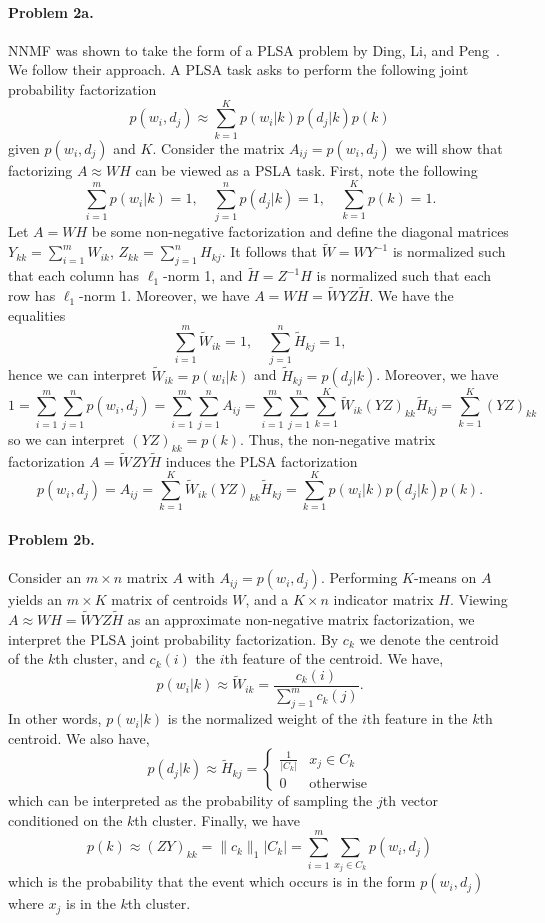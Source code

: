 \documentclass[12pt]{article}
\begin{document}
\paragraph{Problem 2a.}
NNMF was shown to take the form of a PLSA problem by Ding, Li, and Peng~\cite{Ding2008}. We follow their approach.
A PLSA task asks to perform the following joint probability factorization \[p(w_i, d_j) \approx \sum_{k=1}^K p(w_i | k) p(d_j | k) p(k) \] given $p(w_i, d_j)$ and $K$. Consider the matrix $A_{ij} = p(w_i, d_j)$ we will show that factorizing $A \approx WH$ can be viewed as a PSLA task.
First, note the following \[ \sum_{i=1}^m p(w_i|k) = 1, \quad  \sum_{j=1}^n p(d_j|k) = 1, \quad \sum_{k=1}^K p(k) = 1.\]
Let $A=WH$ be some non-negative factorization and define the diagonal matrices $Y_{kk} = \sum_{i=1}^m W_{ik}$, $Z_{kk} = \sum_{j=1}^n H_{kj}$.
It follows that $\tilde{W} = WY^{-1}$ is normalized such that each column has $\ell_1$-norm 1, and $\tilde{H} = Z^{-1}H$ is normalized such that each row has $\ell_1$-norm 1. Moreover, we have $A = WH = \tilde{W} Y Z \tilde{H}$.
We have the equalities \[\sum_{i=1}^m \tilde{W}_{ik} = 1, \quad \sum_{j=1}^n \tilde{H}_{kj} = 1,\] hence we can interpret $\tilde{W}_{ik} = p(w_i|k)$ and $\tilde{H}_{kj} = p(d_j|k)$.
Moreover, we have \[1 = \sum_{i=1}^m \sum_{j=1}^n p(w_i, d_j) = \sum_{i=1}^m \sum_{j=1}^n A_{ij} = \sum_{i=1}^m \sum_{j=1}^n \sum_{k=1}^K \tilde{W}_{ik} \left( YZ \right)_{kk} \tilde{H}_{kj} = \sum_{k=1}^K \left(Y Z \right)_{kk}\] so we can interpret $(YZ)_{kk} = p(k)$.
Thus, the non-negative matrix factorization $A = \tilde{W} ZY \tilde{H}$ induces the PLSA factorization \[p(w_i, d_j) = A_{ij} = \sum_{k=1}^K \tilde{W}_{ik} \left(YZ \right)_{kk} \tilde{H}_{kj} = \sum_{k=1}^K p(w_i|k)p(d_j|k)p(k). \]

\paragraph{Problem 2b.}
Consider an $m \times n$ matrix $A$ with $A_{ij} = p(w_i, d_j)$. Performing $K$-means on $A$ yields an $m \times K$ matrix of centroids $W$, and a $K \times n$ indicator matrix $H$.
Viewing $A \approx WH = \tilde{W}YZ\tilde{H}$ as an approximate non-negative matrix factorization, we interpret the PLSA joint probability factorization. By $c_k$ we denote the centroid of the $k$th cluster, and $c_k(i)$ the $i$th feature of the centroid. We have,
\[p(w_i | k) \approx \tilde{W}_{ik} = \frac{c_k(i)}{\sum_{j=1}^m c_k(j)}.  \]
In other words, $p(w_i | k)$ is the normalized weight of the $i$th feature in the $k$th centroid.
We also have, \[ p(d_j | k) \approx \tilde{H}_{kj} = \begin{cases} \frac{1}{|C_k|} & x_j \in C_k \\ 0 & \text{otherwise} \end{cases}\] which can be interpreted as the probability of sampling the $j$th vector conditioned on the $k$th cluster.
Finally, we have \[p(k) \approx (ZY)_{kk} = \|c_k\|_1 |C_k| = \sum_{i=1}^m \sum_{x_j \in C_k} p(w_i, d_j)\] which is the probability that the event which occurs is in the form $p(w_i, d_j)$ where $x_j$ is in the $k$th cluster.
\end{document}

